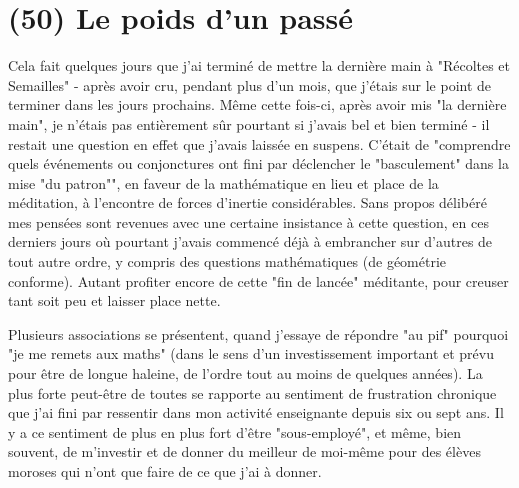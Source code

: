 \section{(50) Le poids d’un passé}

Cela fait quelques jours que j’ai terminé de mettre la dernière main à "Récoltes et Semailles" - après avoir cru, pendant plus d'un mois, que j'étais sur le point de terminer dans les jours prochains. Même cette fois-ci, après avoir mis "la dernière main", je n'étais pas entièrement sûr pourtant si j’avais bel et bien terminé - il restait une question en effet que j’avais laissée en suspens. C’était de "comprendre quels événements ou conjonctures ont fini par déclencher le "basculement" dans la mise "du patron"", en faveur de la mathématique en lieu et place de la méditation, à l'encontre de forces d'inertie considérables. Sans propos délibéré mes pensées sont revenues avec une certaine insistance à cette question, en ces derniers jours où pourtant j'avais commencé déjà à embrancher sur d'autres de tout autre ordre, y compris des questions mathématiques (de géométrie conforme). Autant profiter encore de cette "fin de lancée" méditante, pour creuser tant soit peu et laisser place nette.

Plusieurs associations se présentent, quand j'essaye de répondre "au pif" pourquoi "je me remets aux maths" (dans le sens d'un investissement important et prévu pour être de longue haleine, de l'ordre tout au moins de quelques années). La plus forte peut-être de toutes se rapporte au sentiment de frustration chronique que j’ai fini par ressentir dans mon activité enseignante depuis six ou sept ans. Il y a ce sentiment de plus en plus fort d'être "sous-employé", et même, bien souvent, de m'investir et de donner du meilleur de moi-même pour des élèves moroses qui n’ont que faire de ce que j’ai à donner.

